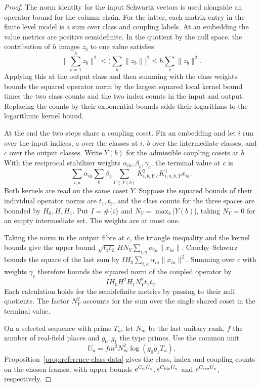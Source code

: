 \begin{proof}
The norm identity for the input Schwartz vectors is used
alongside an operator bound for the column chain. For the
latter, each matrix entry in the finite level model is a sum
over class and coupling labels. At an embedding the value
metrics are positive semidefinite. In the quotient by the null space, the contribution of \(h\)
images \(z_b\) to one value satisfies
\[
 \Big\|\sum_{b=1}^h z_b\Big\|^2\le
 \Big(\sum_b\|z_b\|\Big)^2\le h\sum_b\|z_b\|^2 .
\] Applying this at the output
class and then summing with the class weights bounds the
squared operator norm by the largest squared local
kernel bound times the two class counts and the two
index counts in the input and output. Replacing the
counts by their exponential bounds adds their logarithms
to the logarithmic kernel bound.

At the end the two steps share a coupling coset.
Fix an embedding and let \(i\) run over the input indices,
\(a\) over the classes at \(i\), \(b\) over the intermediate
classes, and \(c\) over the output classes. Write \(Y(b)\)
for the admissible coupling cosets at \(b\). With the
reciprocal stabilizer weights \(\alpha_{ia},\beta_b,\gamma_c\),
the terminal value at \(c\) is
\[
 \sum_{i,a}\alpha_{ia}\sum_b\beta_b
             \sum_{Y\in Y(b)} K^2_{i,b,Y,c} K^1_{i,a,b,Y} x_{ia}.
\]
Both kernels are read on the same coset \(Y\). Suppose the
squared bounds of their individual operator norms are
\(t_1,t_2\), and the class counts for the three spaces are
bounded by \(H_0,H,H_1\). Put \(I=\#\{i\}\) and
\(N_Y=\max_b |Y(b)|\), taking \(N_Y=0\) for an empty
intermediate set. The weights are at most one.

Taking
the norm in the output fibre at \(c\), the triangle
inequality and the kernel bounds give the upper bound
\(\sqrt{t_1t_2}\,H N_Y\sum_{i,a}\alpha_{ia}\|x_{ia}\|\).
Cauchy--Schwarz bounds the square of the last sum by
\(I H_0\sum_{i,a}\alpha_{ia}\|x_{ia}\|^2\).
Summing over \(c\) with weights \(\gamma_c\) therefore bounds
the squared norm of the coupled operator by
\begin{equation}\label{eq:selected-coupled-norm}
       I H_0 H^2 H_1 N_Y^2 t_1t_2.
\end{equation}
Each calculation holds for the semidefinite metrics by passing
to their null quotients. The factor \(N_Y^2\) accounts for the
sum over the single shared coset in the terminal value.

On a selected sequence with prime \(T_u\), let \(N_m\) be the
last unitary rank, \(f\) the number of real-field places
and \(g_0,g_1\) the type primes. Use the common unit
\[
        U_u=fm^2N_m^2\log(g_0g_1T_u).
\]
Proposition~\ref{prop:reference-class-data} gives the class,
index and coupling counts on the chosen frames, with
upper bounds \(e^{C_{\rm cl}U_u},e^{C_{\rm idx}U_u}\) and
\(e^{C_{\rm cos}U_u}\), respectively.


\end{proof}
